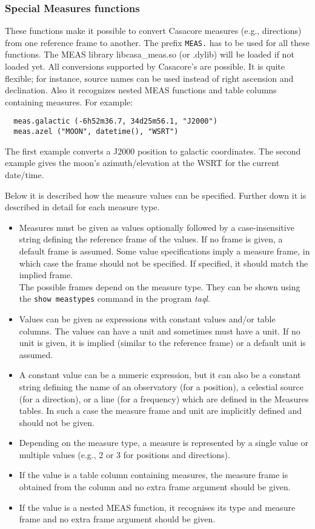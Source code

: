\subsubsection{\label{TAQL:MEASFUNC}Special Measures functions}
These functions make it possible to convert Casacore measures (e.g.,
directions) from one reference frame to another.  The prefix
\texttt{MEAS.} has to be used for all these functions. The MEAS
library libcasa_meas.so (or .dylib) will be loaded if not loaded yet.
All conversions supported by Casacore's 
are possible. It is quite flexible; for instance, source
names can be used instead of right ascension and declination. Also it recognizes
nested MEAS functions and table columns containing measures.
For example:
\begin{verbatim}
  meas.galactic (-6h52m36.7, 34d25m56.1, "J2000")
  meas.azel ("MOON", datetime(), "WSRT")
\end{verbatim}
The first example converts a J2000 position to galactic coordinates.
The second example gives the moon's azimuth/elevation at the WSRT for
the current date/time.

Below it is described how the measure values can be specified.
Further down it is described in detail for each measure type.
\begin{itemize}
\item Measures must be given as values optionally followed by a
  case-insensitive string defining the reference frame of the
  values. If no frame is given, a default frame is assumed.
  Some value specifications imply a measure frame, in which case
  the frame should not be specified. If specified, it should
  match the implied frame.
  \\The possible frames depend on the measure type. They
  can be shown using the
  {\tt show meastypes} command in the program {\em taql}.
\item Values can be given as expressions with constant values and/or table
  columns. The values can have a unit and sometimes must have a unit.
  If no unit is given, it is implied (similar to the reference frame)
  or a default unit is assumed.
\item A constant value can be a numeric expression, but
  it can also be a constant string defining the name of an
  observatory (for a position), a celestial source (for a direction),
  or a line (for a frequency) which are defined in the Measures tables.
  In such a case the measure frame and
  unit are implicitly defined and should not be given.
\item Depending on the measure type, a measure is represented by
  a single value or multiple values (e.g., 2 or 3 for positions and directions).
\item If the value is a table column containing measures, the
  measure frame is obtained from the column and no extra frame
  argument should be given.
\item If the value is a nested MEAS function, it recognises its type
  and measure frame and no extra frame argument should be given.
\end{itemize}

